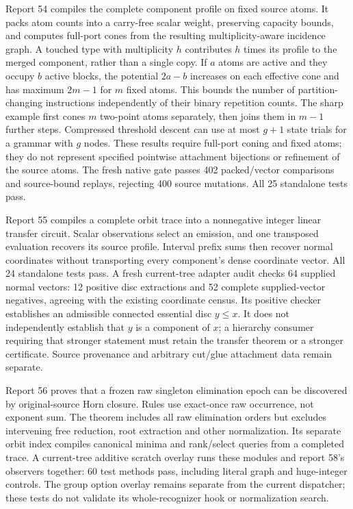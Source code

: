 Report 54 compiles the complete component profile on fixed source atoms.
It packs atom counts into a carry-free scalar weight, preserving capacity
bounds, and computes full-port cones from the resulting multiplicity-aware
incidence graph. A touched type with multiplicity $h$ contributes $h$ times
its profile to the merged component, rather than a single copy. If $a$ atoms
are active and they occupy $b$ active blocks, the potential $2a-b$ increases
on each effective cone and has maximum $2m-1$ for $m$ fixed atoms. This bounds
the number of partition-changing instructions independently of their binary
repetition counts. The sharp example first cones $m$ two-point atoms
separately, then joins them in $m-1$ further steps. Compressed threshold
descent can use at most $g+1$ state trials for a grammar with $g$ nodes.
These results require full-port coning and fixed atoms; they do not represent
specified pointwise attachment bijections or refinement of the source atoms.
The fresh native gate passes 402 packed/vector comparisons and source-bound
replays, rejecting 400 source mutations. All 25 standalone tests pass.

Report 55 compiles a complete orbit trace into a nonnegative integer linear
transfer circuit. Scalar observations select an emission, and one transposed
evaluation recovers its source profile. Interval prefix sums then recover
normal coordinates without transporting every component's dense coordinate
vector. All 24 standalone tests pass. A fresh current-tree adapter audit
checks 64 supplied normal vectors: 12 positive disc extractions and 52
complete supplied-vector negatives, agreeing with the existing coordinate
census. Its positive checker establishes an admissible connected essential
disc $y\le x$. It does not independently establish that $y$ is a component
of $x$; a hierarchy consumer requiring that stronger statement must retain
the transfer theorem or a stronger certificate. Source provenance and
arbitrary cut/glue attachment data remain separate.

Report 56 proves that a frozen raw singleton elimination epoch can be
discovered by original-source Horn closure. Rules use exact-once raw
occurrence, not exponent sum. The theorem includes all raw elimination
orders but excludes intervening free reduction, root extraction and other
normalization. Its separate orbit index compiles canonical minima and
rank/select queries from a completed trace. A current-tree additive scratch
overlay runs these modules and report 58's observers together: 60 test
methods pass, including literal graph and huge-integer controls. The group
option overlay remains separate from the current dispatcher; these tests
do not validate its whole-recognizer hook or normalization search.

